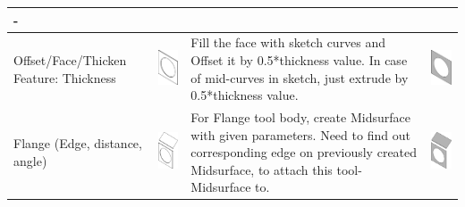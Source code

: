 \begin{longtable}{ L{0.18\textwidth} C{0.18\textwidth} L{0.38\textwidth}  C{0.18\textwidth}}
- \\
\hline
Offset/Face/Thicken Feature: Thickness &
\includegraphics[scale=0.3]{..//Common/images//DryRun3.png} &
Fill the face with sketch curves and Offset it by 0.5*thickness value. In case of mid-curves in sketch, just extrude by 0.5*thickness value. &
\includegraphics[scale=0.3]{..//Common/images//DryRun31.png} \\
\hline
Flange (Edge, distance, angle)  &
\includegraphics[scale=0.3]{..//Common/images//DryRun4.png} &
For Flange tool body, create Midsurface with given parameters. Need to find out corresponding edge on previously created Midsurface, to attach this tool-Midsurface to. &
\includegraphics[scale=0.3]{..//Common/images//DryRun41.png} \\

\end{longtable}
